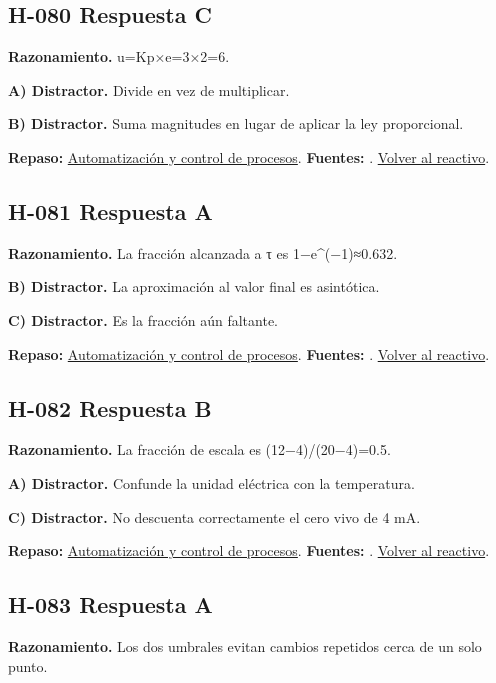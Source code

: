 \subsection*{H-080 \quad Respuesta C}\label{s:H-080}
\textbf{Razonamiento.} u=Kp×e=3×2=6.

\textbf{A) Distractor. }Divide en vez de multiplicar.

\textbf{B) Distractor. }Suma magnitudes en lugar de aplicar la ley proporcional.

\textbf{Repaso:} \hyperref[sec:h4]{Automatización y control de procesos}. \textbf{Fuentes:} \cite{control,signals,pid}. \hyperref[q:H-080]{Volver al reactivo}.\par\medskip

\subsection*{H-081 \quad Respuesta A}\label{s:H-081}
\textbf{Razonamiento.} La fracción alcanzada a τ es 1−e\textasciicircum{}(−1)≈0.632.

\textbf{B) Distractor. }La aproximación al valor final es asintótica.

\textbf{C) Distractor. }Es la fracción aún faltante.

\textbf{Repaso:} \hyperref[sec:h4]{Automatización y control de procesos}. \textbf{Fuentes:} \cite{control,signals,pid}. \hyperref[q:H-081]{Volver al reactivo}.\par\medskip

\subsection*{H-082 \quad Respuesta B}\label{s:H-082}
\textbf{Razonamiento.} La fracción de escala es (12−4)/(20−4)=0.5.

\textbf{A) Distractor. }Confunde la unidad eléctrica con la temperatura.

\textbf{C) Distractor. }No descuenta correctamente el cero vivo de 4 mA.

\textbf{Repaso:} \hyperref[sec:h4]{Automatización y control de procesos}. \textbf{Fuentes:} \cite{control,signals,pid}. \hyperref[q:H-082]{Volver al reactivo}.\par\medskip

\subsection*{H-083 \quad Respuesta A}\label{s:H-083}
\textbf{Razonamiento.} Los dos umbrales evitan cambios repetidos cerca de un solo punto.

